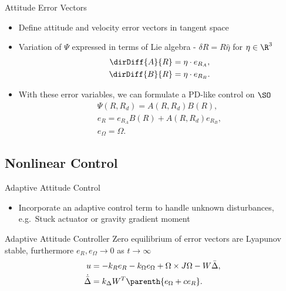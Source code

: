 \documentclass[11pt,professionalfonts]{beamer}
\newcommand{\vs}{\vspace{0.3cm}}
\begin{document}
\begin{frame}{Attitude Error Vectors} %
	\begin{itemize}
		\item Define attitude and velocity error vectors in tangent space 
		\item Variation of \( \Psi \) expressed in terms of Lie algebra - \( \delta R = R \hat{\eta} \) for \( \eta \in \R^3 \)
		\begin{align*}
			\dirDiff{A}{R} &= \eta \cdot e_{R_A} ,\\
			\dirDiff{B}{R} &= \eta \cdot e_{R_{B}} . 
		\end{align*}
		\item With these error variables, we can formulate a PD-like control on \( \SO \)
		\begin{gather*}
			\Psi(R, R_d) = A(R, R_d) B(R) , \label{eqn:psi} \\
			e_R = e_{R_A} B(R) + A(R,R_d) e_{R_B} , \label{eqn:eR} \\
			e_\Omega = \Omega .   \label{eqn:eW} 
		\end{gather*}
		
	
	\end{itemize}
	
\end{frame} %

\subsection*{Nonlinear Control}

\begin{frame}{Adaptive Attitude Control} %
\begin{itemize}
	\item Incorporate an adaptive control term to handle unknown disturbances, e.g.\ Stuck actuator or gravity gradient moment
\end{itemize}
\pause
\vs
	\begin{block}{Adaptive Attitude Controller}
		Zero equilibrium of error vectors are Lyapunov stable, furthermore \( e_R , e_\Omega \to 0 \) as \( t \to \infty \)
		\begin{align*}
			u &= - k_R e_R - k_{\Omega} e_{\Omega} + \Omega \times J \Omega - W \bar{\Delta}, \\
			\dot{\bar{\Delta}} &= k_\Delta W^T \parenth{ e_\Omega + c e_R } .
		\end{align*}
	\end{block}
	
\end{frame}   %
\end{document}
